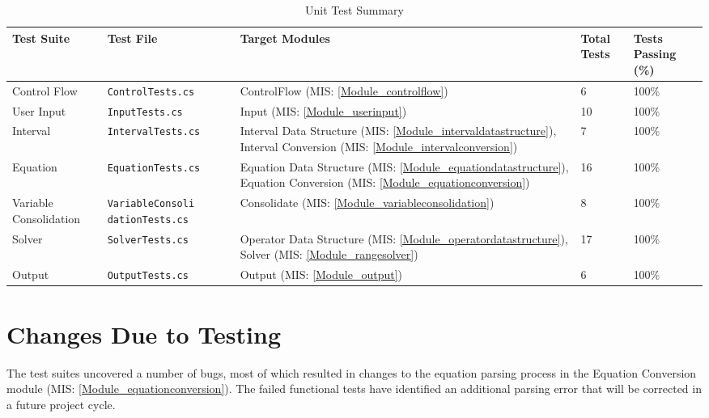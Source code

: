 \documentclass[12pt, titlepage]{article}
\newcommand{\misref}[1]{MIS: \ref{#1}}
\begin{document}
\begin{center}
		\begin{longtable}{ | p{2.5cm} | p{4cm} | p{2.5cm} | m{1cm} | m{1.5cm} 
		|}
		\caption{Unit Test Summary} \\ \hline \label{TblUnitTests} 
		\textbf{Test Suite} & \textbf{Test File} & \textbf{Target Modules} & 
		\textbf{Total Tests} & 
		\textbf{Tests Passing (\%)}  \\ 
		\hline
		Control Flow & \texttt{ControlTests.cs} & ControlFlow 
		(\misref{Module_controlflow}) & 6 & 100\% \\ 
		\hline
		
		User Input & \texttt{InputTests.cs} &Input (\misref{Module_userinput}) 
		& 10 & 100\% \\ \hline
		
		Interval & \texttt{IntervalTests.cs} &Interval Data Structure 
		(\misref{Module_intervaldatastructure}), Interval Conversion 
		(\misref{Module_intervalconversion}) & 7 & 100\% \\ \hline
		
		Equation & \texttt{EquationTests.cs} &Equation Data Structure 
		(\misref{Module_equationdatastructure}), Equation Conversion 
		(\misref{Module_equationconversion}) & 16 & 100\% \\ \hline
		
		Variable Consolidation & \texttt{VariableConsoli dationTests.cs} & 
		Consolidate 
		(\misref{Module_variableconsolidation}) & 8 & 100\% \\ \hline
		
		Solver &\texttt{SolverTests.cs} & Operator Data Structure 
		(\misref{Module_operatordatastructure}), Solver 
		(\misref{Module_rangesolver}) & 17 & 100\% \\ \hline
		
		Output & \texttt{OutputTests.cs} &Output (\misref{Module_output}) & 6 & 
		100\% \\ \hline
	\end{longtable}
\end{center}

\section{Changes Due to Testing}
The test suites uncovered a number of bugs, most of which resulted in changes 
to the equation parsing process in the Equation Conversion module 
(\misref{Module_equationconversion}). The failed functional tests have 
identified an additional parsing error that will be corrected in a future 
project cycle.
\end{document}
